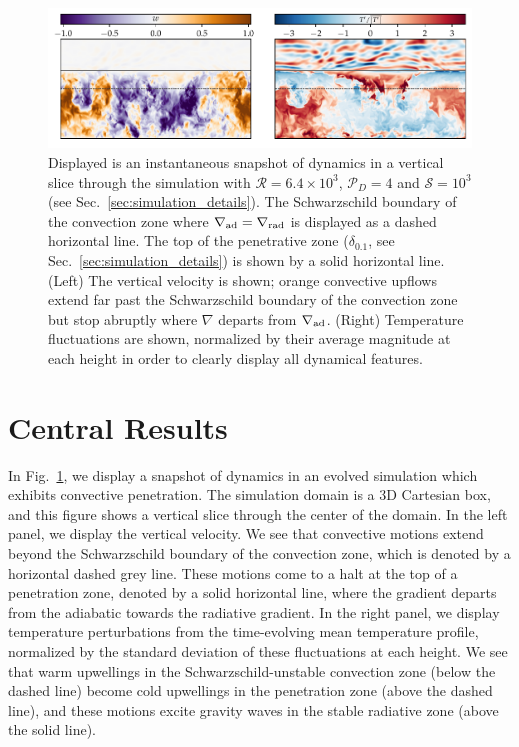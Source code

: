 \documentclass[twocolumn]{aastex631}
\newcommand{\gradrad}{\ensuremath{\nabla_{\rm{rad}}}}
\newcommand{\gradad}{\ensuremath{\nabla_{\rm{ad}}}}
\newcommand{\justgrad}{\ensuremath{\nabla}}
\newcommand{\mP}{\ensuremath{\mathcal{P}}}
\newcommand{\mR}{\ensuremath{\mathcal{R}}}
\newcommand{\mS}{\ensuremath{\mathcal{S}}}
\begin{document}
\begin{figure}[t]
\centering
\includegraphics[width=\textwidth]{vertical_dynamics_panels.pdf}
\caption{
Displayed is an instantaneous snapshot of dynamics in a vertical slice through the simulation with $\mR = 6.4 \times 10^3$, $\mP_D = 4$ and $\mS = 10^3$ (see Sec.~\ref{sec:simulation_details}).
The Schwarzschild boundary of the convection zone where $\gradad = \gradrad$ is displayed as a dashed horizontal line.
The top of the penetrative zone ($\delta_{0.1}$, see Sec.~\ref{sec:simulation_details}) is shown by a solid horizontal line.
(Left) The vertical velocity is shown; orange convective upflows extend far past the Schwarzschild boundary of the convection zone but stop abruptly where $\justgrad$ departs from $\gradad$.
(Right) Temperature fluctuations are shown, normalized by their average magnitude at each height in order to clearly display all dynamical features.
\label{fig:vertical_dynamics_panels}
}
\end{figure}

\section{Central Results}
\label{sec:central_results}

In Fig.~\ref{fig:vertical_dynamics_panels}, we display a snapshot of dynamics in an evolved simulation which exhibits convective penetration.
The simulation domain is a 3D Cartesian box, and this figure shows a vertical slice through the center of the domain.
In the left panel, we display the vertical velocity.
We see that convective motions extend beyond the Schwarzschild boundary of the convection zone, which is denoted by a horizontal dashed grey line.
These motions come to a halt at the top of a penetration zone, denoted by a solid horizontal line, where the gradient departs from the adiabatic towards the radiative gradient.
In the right panel, we display temperature perturbations from the time-evolving mean temperature profile, normalized by the standard deviation of these fluctuations at each height.
We see that warm upwellings in the Schwarzschild-unstable convection zone (below the dashed line) become cold upwellings in the penetration zone (above the dashed line), and these motions excite gravity waves in the stable radiative zone (above the solid line).
\end{document}
